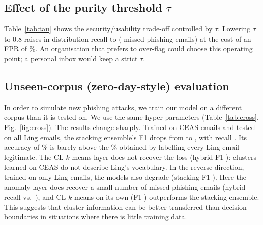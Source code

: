 \documentclass[conference]{IEEEtran}
\begin{document}
\subsection{Effect of the purity threshold $\tau$}
Table~\ref{tab:tau} shows the security/usability trade-off controlled by $\tau$. Lowering $\tau$ to 0.8 raises in-distribution recall to \TauEightRec{} (\TauEightFN{} missed phishing emails) at the cost of an FPR of \TauEightFPR\%. An organisation that prefers to over-flag could choose this operating point; a personal inbox would keep a strict $\tau$.

\begin{table}[t]
\centering
\caption{Hybrid performance as a function of the purity threshold $\tau$ ($k=\CLKk$)}
\label{tab:tau}
\resizebox{\columnwidth}{!}{}
\end{table}

\subsection{Unseen-corpus (zero-day-style) evaluation}\label{sec:cross}
In order to simulate new phishing attacks, we train our model on a different corpus than it is tested on. We use the same hyper-parameters (Table~\ref{tab:cross}, Fig.~\ref{fig:cross}). The results change sharply. Trained on \XCLNtrain{} CEAS emails and tested on all \XCLNtest{} Ling emails, the stacking ensemble's F1 drops from \StackFone{} to \XCLStackFone, with recall \XCLStackRec{}. Its accuracy of \XCLStackAcc\% is barely above the \LingMajority\% obtained by labelling every Ling email legitimate. The CL-$k$-means layer does not recover the loss (hybrid F1 \XCLHybFone): clusters learned on CEAS do not describe Ling's vocabulary. In the reverse direction, trained on only \XLCNtrain{} Ling emails, the models also degrade (stacking F1 \XLCStackFone). Here the anomaly layer does recover a small number of missed phishing emails (hybrid recall \XLCHybRec{} vs.\ \XLCStackRec{}), and CL-$k$-means on its own (F1 \XLCCLKFone) outperforms the stacking ensemble. This suggests that cluster information can be better transferred than decision boundaries in situations where there is little training data. 

\begin{table}[t]
\centering
\caption{Unseen-corpus results: train on one corpus, test on the other}
\label{tab:cross}
\resizebox{\columnwidth}{!}{}
\end{table}
\end{document}
